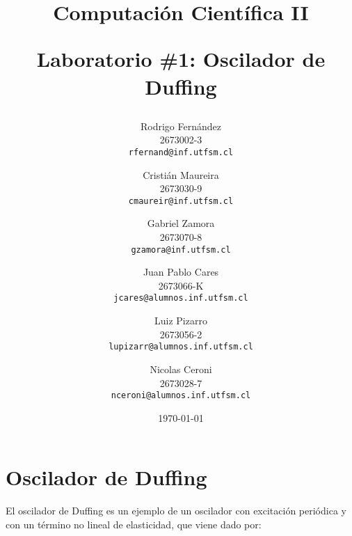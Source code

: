 \documentclass[letter, 10pt]{article}
\begin{document}
\title{Computación Científica II\\ \begin{Large} Laboratorio \#1: Oscilador de
Duffing \end{Large}}
\author{
Rodrigo Fernández \\ 2673002-3 \\ \texttt{rfernand@inf.utfsm.cl} \and
Cristián Maureira \\ 2673030-9 \\ \texttt{cmaureir@inf.utfsm.cl} \and
Gabriel Zamora \\ 2673070-8 \\ \texttt{gzamora@inf.utfsm.cl} \and
Juan Pablo Cares \\ 2673066-K \\ \texttt{jcares@alumnos.inf.utfsm.cl} \and
Luiz Pizarro \\ 2673056-2 \\ \texttt{lupizarr@alumnos.inf.utfsm.cl} \and
Nicolas Ceroni \\ 2673028-7 \\ \texttt{nceroni@alumnos.inf.utfsm.cl}
}

\date{\today}
\maketitle

\section{Oscilador de Duffing}
El oscilador de Duffing es un ejemplo de un oscilador con excitación periódica y con un término no lineal de elasticidad, que viene dado por:
\end{document}
